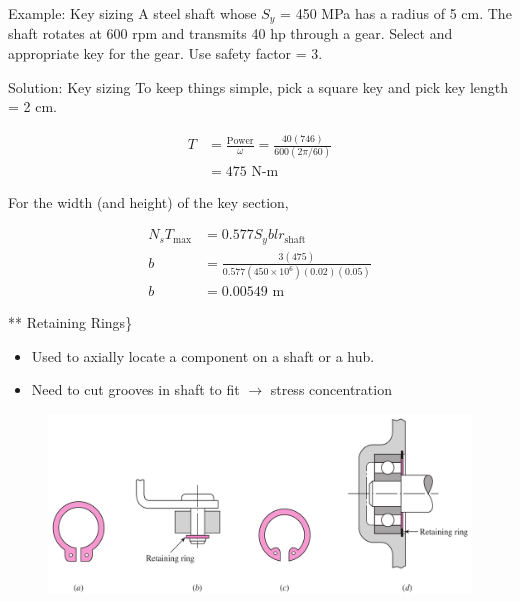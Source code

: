 \documentclass[10pt, svgnames]{beamer}
\begin{document}
\begin{frame}[label={sec:org6a3b8ec}]{Example: Key sizing}
A steel shaft whose \(S_{y}\) = 450 MPa has a radius of 5 cm. The shaft rotates at 600 rpm and transmits 40 hp through a gear. Select and appropriate key for the gear. Use safety factor = 3.

\begin{figure}[htbp]
  \centering
\end{figure}
\end{frame}

\begin{frame}[label={sec:orga639a17}]{Solution: Key sizing}
To keep things simple, pick a square key and pick key length = 2 cm.

\begin{align*}
  T &= \frac{\text{Power}}{\omega} = \frac{40(746)}{600(2\pi/60)} \\
    &= 475 \text{ N-m}
\end{align*}

For the width (and height) of the key section,

\begin{align*}
  N_{s} T_{\max} &= 0.577S_{y}blr_{\text{shaft}} \\
  b &= \frac{3(475)}{0.577(450 \times 10^{6})(0.02)(0.05)} \\
  b &= 0.00549 \text{ m}
\end{align*}


** Retaining Rings\}

\begin{itemize}
\item Used to axially locate a component on a shaft or a hub.
\item Need  to cut grooves in shaft to fit \(\rightarrow\) stress concentration
\end{itemize}

\begin{figure}[htbp]
  \centering
  \includegraphics[width=\textwidth]{Pictures/retaining-rings}
\end{figure}
\end{frame}
\end{document}
